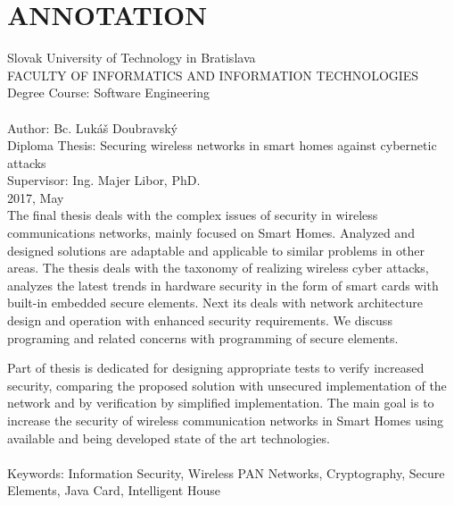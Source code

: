 \documentclass[12pt,a4wide,oneside,openright]{report}
\begin{document}
\chapter*{ANNOTATION}
\thispagestyle{empty}
\noindent Slovak University of Technology in Bratislava \\
FACULTY OF INFORMATICS AND INFORMATION TECHNOLOGIES \\
Degree Course: Software Engineering \\ \\
Author: Bc. Lukáš Doubravský \\
Diploma Thesis: 
Securing wireless networks in smart homes against cybernetic attacks  \\
Supervisor: Ing. Majer Libor, PhD. \\
2017, May \\

The final thesis deals with the complex issues of security in wireless communications networks, mainly focused on Smart Homes. Analyzed and designed solutions are adaptable and applicable to similar problems in other areas.
The thesis deals with the taxonomy of realizing wireless cyber attacks, analyzes the latest trends in hardware security in the form of smart cards with built-in embedded secure elements. Next its deals with network architecture design and operation with enhanced security requirements. We discuss programing and related concerns with programming of secure elements.

Part of thesis is dedicated for designing appropriate tests to verify increased security, comparing the proposed solution with unsecured implementation of the network and by verification by simplified implementation.
The main goal is to increase the security of wireless communication networks in Smart Homes using available and being developed state of the art technologies.
\\ \\
Keywords: Information Security, Wireless PAN Networks, Cryptography, Secure Elements, Java Card, Intelligent House

\newpage
\setcounter{page}{0}
\singlespacing
\tableofcontents
\onehalfspacing



\newpage 
{}
\setcounter{page}{1}
\end{document}
